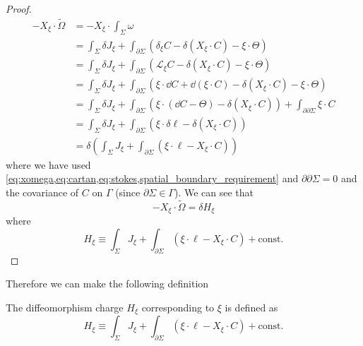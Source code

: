 \documentclass[10pt]{article}
\begin{document}
\begin{proof}
\begin{equation}
\begin{split}
            -X_\xi\cdot\widetilde{\Omega}&=-X_\xi\cdot\int_\Sigma \omega\\
                                     &=\int_{\Sigma}\delta J_\xi+\int_{\partial\Sigma}(\delta_\xi C-\delta(X_\xi\cdot C)-\xi\cdot\Theta)\\
                                     &=\int_{\Sigma}\delta J_\xi+\int_{\partial\Sigma}(\mathcal{L}_\xi C-\delta(X_\xi\cdot C)-\xi\cdot\Theta)\\
                                     &=\int_{\Sigma}\delta J_\xi+\int_{\partial\Sigma}(\xi\cdot\dd{C}+\dd{(\xi\cdot C)}-\delta(X_\xi\cdot C)-\xi\cdot\Theta)\\
                                     &=\int_{\Sigma}\delta J_\xi+\int_{\partial\Sigma}(\xi\cdot(\dd{C}-\Theta)-\delta(X_\xi\cdot C))+\int_{\partial\partial\Sigma}\xi\cdot C\\
                                     &=\int_{\Sigma}\delta J_\xi+\int_{\partial\Sigma}(\xi\cdot\delta\ell-\delta(X_\xi\cdot C))\\
                                     &=\delta\left(\int_\Sigma J_\xi+\int_{\partial\Sigma}(\xi\cdot\ell-X_\xi\cdot C)\right)
        \end{split}
    \end{equation}
    where we have used \cref{eq:xomega,eq:cartan,eq:stokes,spatial_boundary_requirement} and $\partial\partial\Sigma=0$ and the covariance of $C$ on $\Gamma$ (since $\partial \Sigma\in\Gamma$). 
    We can see that
    \begin{equation}
        -X_\xi\cdot\widetilde{\Omega}=\delta H_\xi
    \end{equation}
    where
    \begin{equation}
        H_\xi\equiv\int_{\Sigma}J_{\xi}+\int_{\partial\Sigma}(\xi\cdot\ell-X_\xi\cdot C)+\text{const.}
    \end{equation}

\end{proof}
Therefore we can make the following definition
\begin{definition}
    The diffeomorphism charge $H_\xi$ corresponding to $\xi$ is defined as 
    \begin{equation}
        H_\xi\equiv\int_{\Sigma}J_{\xi}+\int_{\partial\Sigma}(\xi\cdot\ell-X_\xi\cdot C)+\text{const.}
    \end{equation}
\end{definition}
\end{document}
